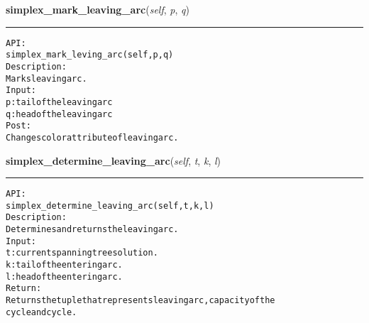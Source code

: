 \hspace{.8\funcindent}\begin{boxedminipage}{\funcwidth}

    \raggedright \textbf{simplex\_mark\_leaving\_arc}(\textit{self}, \textit{p}, \textit{q})

    \vspace{-1.5ex}

    \rule{\textwidth}{0.5\fboxrule}
\setlength{\parskip}{2ex}
\begin{alltt}

API:
    simplex\_mark\_leving\_arc(self, p, q)
Description:
    Marks leaving arc.
Input:
    p: tail of the leaving arc
    q: head of the leaving arc
Post:
    Changes color attribute of leaving arc.
\end{alltt}

\setlength{\parskip}{1ex}
    \end{boxedminipage}

    \label{coinor:gimpy:graph:Graph:simplex_determine_leaving_arc}

    \vspace{0.5ex}

\hspace{.8\funcindent}\begin{boxedminipage}{\funcwidth}

    \raggedright \textbf{simplex\_determine\_leaving\_arc}(\textit{self}, \textit{t}, \textit{k}, \textit{l})

    \vspace{-1.5ex}

    \rule{\textwidth}{0.5\fboxrule}
\setlength{\parskip}{2ex}
\begin{alltt}

API:
    simplex\_determine\_leaving\_arc(self, t, k, l)
Description:
    Determines and returns the leaving arc.
Input:
    t: current spanning tree solution.
    k: tail of the entering arc.
    l: head of the entering arc.
Return:
    Returns the tuple that represents leaving arc, capacity of the
    cycle and cycle.
\end{alltt}

\setlength{\parskip}{1ex}
    \end{boxedminipage}

    \label{coinor:gimpy:graph:Graph:simplex_mark_entering_arc}


